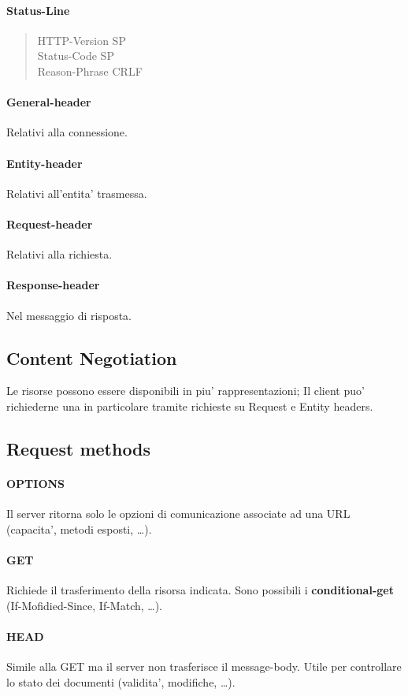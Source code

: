 \paragraph{Status-Line}
\begin{quote}
    HTTP-Version SP \\
    Status-Code SP \\
    Reason-Phrase CRLF
\end{quote}
\paragraph{General-header} Relativi alla connessione.
\paragraph{Entity-header} Relativi all'entita' trasmessa.
\paragraph{Request-header} Relativi alla richiesta.
\paragraph{Response-header} Nel messaggio di risposta.
\subsection{Content Negotiation}
Le risorse possono essere disponibili in piu' rappresentazioni; Il client puo' richiederne una in particolare tramite richieste su Request e Entity headers.
\subsection{Request methods}
\paragraph{OPTIONS} Il server ritorna solo le opzioni di comunicazione associate ad una URL (capacita', metodi esposti, \dots).
\paragraph{GET} Richiede il trasferimento della risorsa indicata. Sono possibili i \textbf{conditional-get} (If-Mofidied-Since, If-Match, \dots).
\paragraph{HEAD} Simile alla GET ma il server non trasferisce il message-body. Utile per controllare lo stato dei documenti (validita', modifiche, \dots).
